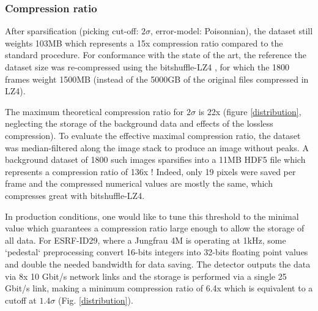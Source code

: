 \documentclass[preprint]{iucr}              %
\begin{document}
\subsubsection{Compression ratio} 
After sparsification (picking cut-off: $2\sigma$, error-model: Poisonnian), the dataset still weights 103MB which represents a 15x compression ratio compared to the standard procedure.
For conformance with the state of the art, the reference the dataset size was re-compressed using the bitshuffle-LZ4 \cite{bitshuffle}, for which the 1800 frames weight 1500MB (instead of the 5000GB of the original files compressed in LZ4).

The maximum theoretical compression ratio for $2\sigma$ is 22x (figure \ref{distribution}, neglecting the storage of the background data and effects of the lossless compression).
To evaluate the effective maximal compression ratio, the dataset was median-filtered along the image stack
to produce an image without peaks. 
A background dataset of 1800 such images sparsifies into a 11MB HDF5 file which represents a compression ratio of 136x ! 
Indeed, only 19 pixels were saved per frame and the compressed numerical values are mostly the same, which compresses great with bitshuffle-LZ4.

In production conditions, one would like to tune this threshold to the minimal value which guarantees a compression ratio large enough to allow the storage of all data.
For ESRF-ID29, where a Jungfrau 4M is operating at 1kHz, some `pedestal` preprocessing convert 16-bits integers into 32-bits floating point values and double the needed bandwidth for data saving. 
The detector outputs the data via 8x 10 Gbit/s network links and the storage is performed via  a single  25 Gbit/s link, making a minimum compression ratio of 6.4x which is equivalent to a cutoff at $1.4\sigma$ (Fig. \ref{distribution}).
\end{document}
